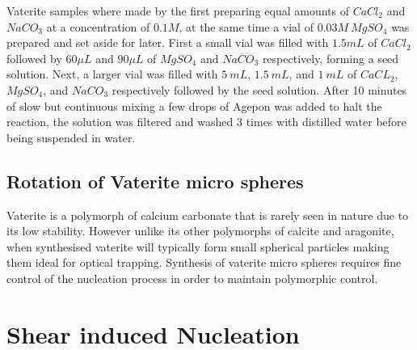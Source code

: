 Vaterite samples where made by the first preparing equal amounts of 
$CaCl_2$ and $NaCO_3$ at a concentration of $0.1M$, at the same time
a vial of $0.03M\ MgSO_4$ was prepared and set aside for later. First
a small vial was filled with $1.5mL$ of $CaCl_2$ followed by $60\mu L$ 
and $90\mu L$ of $MgSO_4$ and $NaCO_3$ respectively, forming a seed solution. 
Next, a larger vial was filled with $5\ mL$, $1.5\ mL$, and $1\ mL$ of
$CaCL_2$, $MgSO_4$, and $NaCO_3$ respectively followed by the seed solution. 
After 10 minutes of slow but continuous mixing a few drops of Agepon was added
to halt the reaction, the solution was filtered and washed 3 times with 
distilled water before being suspended in water. 

\subsection{Rotation of Vaterite micro spheres}
Vaterite is a polymorph of calcium carbonate that is rarely seen in 
nature due to its low stability. However unlike its other polymorphs of 
calcite and aragonite, when synthesised vaterite will typically form 
small spherical particles making them ideal for optical trapping. 
Synthesis of vaterite micro spheres requires fine control of the nucleation process in order to maintain polymorphic control. 

\section{Shear induced Nucleation}

